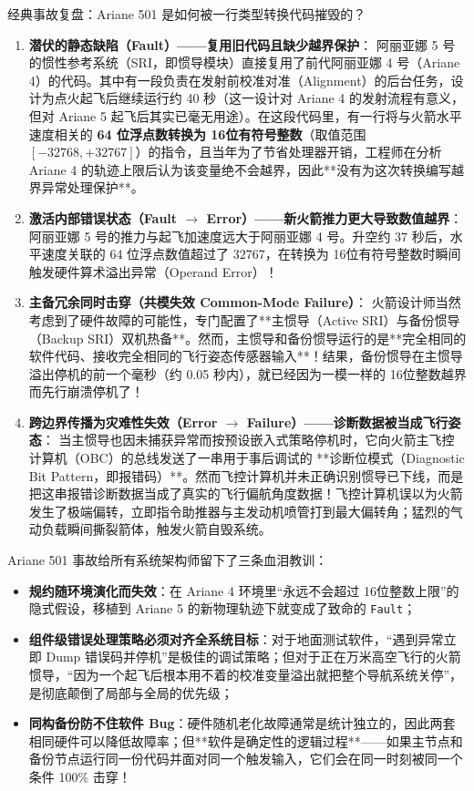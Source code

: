 \documentclass[a4paper]{article}
\begin{document}
\begin{warningbox}{经典事故复盘：Ariane 501 是如何被一行类型转换代码摧毁的？}
\begin{enumerate}
    \item \textbf{潜伏的静态缺陷（Fault）——复用旧代码且缺少越界保护}：
    阿丽亚娜 5 号的惯性参考系统（SRI，即惯导模块）直接复用了前代阿丽亚娜 4 号（Ariane 4）的代码。其中有一段负责在发射前校准对准（Alignment）的后台任务，设计为点火起飞后继续运行约 40 秒（这一设计对 Ariane 4 的发射流程有意义，但对 Ariane 5 起飞后其实已毫无用途）。在这段代码里，有一行将与火箭水平速度相关的 \textbf{64 位浮点数转换为 16位有符号整数}（取值范围 $[-32768, +32767]$）的指令，且当年为了节省处理器开销，工程师在分析 Ariane 4 的轨迹上限后认为该变量绝不会越界，因此**没有为这次转换编写越界异常处理保护**。
    \item \textbf{激活内部错误状态（Fault $\to$ Error）——新火箭推力更大导致数值越界}：
    阿丽亚娜 5 号的推力与起飞加速度远大于阿丽亚娜 4 号。升空约 37 秒后，水平速度关联的 64 位浮点数值超过了 $32767$，在转换为 16位有符号整数时瞬间触发硬件算术溢出异常（Operand Error）！
    \item \textbf{主备冗余同时击穿（共模失效 Common-Mode Failure）}：
    火箭设计师当然考虑到了硬件故障的可能性，专门配置了**主惯导（Active SRI）与备份惯导（Backup SRI）双机热备**。然而，主惯导和备份惯导运行的是**完全相同的软件代码、接收完全相同的飞行姿态传感器输入**！结果，备份惯导在主惯导溢出停机的前一个毫秒（约 0.05 秒内），就已经因为一模一样的 16位整数越界而先行崩溃停机了！
    \item \textbf{跨边界传播为灾难性失效（Error $\to$ Failure）——诊断数据被当成飞行姿态}：
    当主惯导也因未捕获异常而按预设嵌入式策略停机时，它向火箭主飞控计算机（OBC）的总线发送了一串用于事后调试的 **诊断位模式（Diagnostic Bit Pattern，即报错码）**。然而飞控计算机并未正确识别惯导已下线，而是把这串报错诊断数据当成了真实的飞行偏航角度数据！飞控计算机误以为火箭发生了极端偏转，立即指令助推器与主发动机喷管打到最大偏转角；猛烈的气动负载瞬间撕裂箭体，触发火箭自毁系统。
\end{enumerate}
\end{warningbox}

Ariane 501 事故给所有系统架构师留下了三条血泪教训：
\begin{itemize}
    \item \textbf{规约随环境演化而失效}：在 Ariane 4 环境里“永远不会超过 16位整数上限”的隐式假设，移植到 Ariane 5 的新物理轨迹下就变成了致命的 \texttt{Fault}；
    \item \textbf{组件级错误处理策略必须对齐全系统目标}：对于地面测试软件，“遇到异常立即 Dump 错误码并停机”是极佳的调试策略；但对于正在万米高空飞行的火箭惯导，“因为一个起飞后根本用不着的校准变量溢出就把整个导航系统关停”，是彻底颠倒了局部与全局的优先级；
    \item \textbf{同构备份防不住软件 Bug}：硬件随机老化故障通常是统计独立的，因此两套相同硬件可以降低故障率；但**软件是确定性的逻辑过程**——如果主节点和备份节点运行同一份代码并面对同一个触发输入，它们会在同一时刻被同一个条件 100\% 击穿！
\end{itemize}
\end{document}
